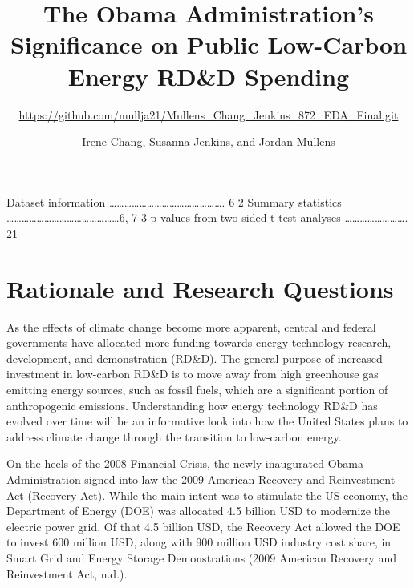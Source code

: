 \documentclass[
  12pt,
]{article}
\title{The Obama Administration's Significance on Public Low-Carbon
Energy RD\&D Spending}
\subtitle{\url{https://github.com/mullja21/Mullens_Chang_Jenkins_872_EDA_Final.git}}
\author{Irene Chang, Susanna Jenkins, and Jordan Mullens}
\date{}
\begin{document}
\maketitle

\newpage
\tableofcontents 
\newpage
{}

Dataset information
\ldots\ldots\ldots\ldots\ldots\ldots\ldots\ldots\ldots\ldots\ldots\ldots\ldots\ldots\ldots.
6 2 Summary statistics
\ldots\ldots\ldots\ldots\ldots\ldots\ldots\ldots\ldots\ldots\ldots\ldots\ldots\ldots\ldots6,
7 3 p-values from two-sided t-test analyses
\ldots\ldots\ldots\ldots\ldots\ldots\ldots\ldots. 21

\newpage
\newpage
\listoffigures 
\newpage

\hypertarget{rationale-and-research-questions}{%
\section{Rationale and Research
Questions}\label{rationale-and-research-questions}}

As the effects of climate change become more apparent, central and
federal governments have allocated more funding towards energy
technology research, development, and demonstration (RD\&D). The general
purpose of increased investment in low-carbon RD\&D is to move away from
high greenhouse gas emitting energy sources, such as fossil fuels, which
are a significant portion of anthropogenic emissions. Understanding how
energy technology RD\&D has evolved over time will be an informative
look into how the United States plans to address climate change through
the transition to low-carbon energy.

On the heels of the 2008 Financial Crisis, the newly inaugurated Obama
Administration signed into law the 2009 American Recovery and
Reinvestment Act (Recovery Act). While the main intent was to stimulate
the US economy, the Department of Energy (DOE) was allocated 4.5 billion
USD to modernize the electric power grid. Of that 4.5 billion USD, the
Recovery Act allowed the DOE to invest 600 million USD, along with 900
million USD industry cost share, in Smart Grid and Energy Storage
Demonstrations (2009 American Recovery and Reinvestment Act, n.d.).
\end{document}
